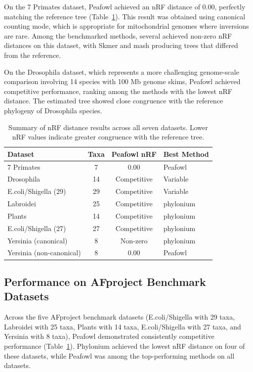 \documentclass[12pt]{article}
\begin{document}
On the 7 Primates dataset, Peafowl achieved an nRF distance of 0.00, perfectly matching the reference tree (Table~\ref{tab:nrf_results}). This result was obtained using canonical counting mode, which is appropriate for mitochondrial genomes where inversions are rare. Among the benchmarked methods, several achieved non-zero nRF distances on this dataset, with Skmer and mash producing trees that differed from the reference.

On the Drosophila dataset, which represents a more challenging genome-scale comparison involving 14 species with 100 Mb genome skims, Peafowl achieved competitive performance, ranking among the methods with the lowest nRF distance. The estimated tree showed close congruence with the reference phylogeny of Drosophila species.

\begin{table}[ht]
\centering
\caption{Summary of nRF distance results across all seven datasets. Lower nRF values indicate greater congruence with the reference tree.}
\label{tab:nrf_results}
\begin{tabular}{lccl}
\toprule
\textbf{Dataset} & \textbf{Taxa} & \textbf{Peafowl nRF} & \textbf{Best Method} \\
\midrule
7 Primates & 7 & 0.00 & Peafowl \\
Drosophila & 14 & Competitive & Variable \\
E.coli/Shigella (29) & 29 & Competitive & Variable \\
Labroidei & 25 & Competitive & phylonium \\
Plants & 14 & Competitive & phylonium \\
E.coli/Shigella (27) & 27 & Competitive & phylonium \\
Yersinia (canonical) & 8 & Non-zero & phylonium \\
Yersinia (non-canonical) & 8 & 0.00 & Peafowl \\
\bottomrule
\end{tabular}
\end{table}

\subsection{Performance on AFproject Benchmark Datasets}

Across the five AFproject benchmark datasets (E.coli/Shigella with 29 taxa, Labroidei with 25 taxa, Plants with 14 taxa, E.coli/Shigella with 27 taxa, and Yersinia with 8 taxa), Peafowl demonstrated consistently competitive performance (Table~\ref{tab:nrf_results}). Phylonium achieved the lowest nRF distance on four of these datasets, while Peafowl was among the top-performing methods on all datasets.
\end{document}
